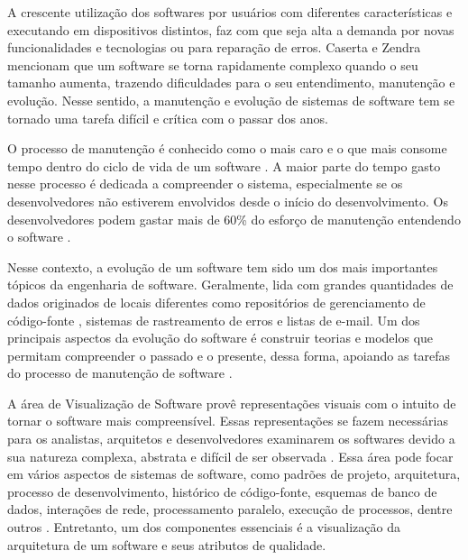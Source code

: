 
A crescente utilização dos softwares por usuários com diferentes características e executando em dispositivos distintos, faz com que seja alta a demanda por novas funcionalidades e tecnologias ou para reparação de erros. Caserta e Zendra \cite{Caserta2011} mencionam que um software se torna rapidamente complexo quando o seu tamanho aumenta, trazendo dificuldades para o seu entendimento, manutenção e evolução. Nesse sentido, a manutenção e evolução de sistemas de software tem se tornado uma tarefa difícil e crítica com o passar dos anos.

O processo de manutenção é conhecido como o mais caro e o que mais consome tempo dentro do ciclo de vida de um software \cite{Abreu1995}. A maior parte do tempo gasto nesse processo é dedicada a compreender o sistema, especialmente se os desenvolvedores não estiverem envolvidos desde o início do desenvolvimento. Os desenvolvedores podem gastar mais de 60\% do esforço de manutenção entendendo o software \cite{Corbi1989}.

Nesse contexto, a evolução de um software tem sido um dos mais importantes tópicos da engenharia de software. Geralmente, lida com grandes quantidades de dados originados de locais diferentes como repositórios de gerenciamento de código-fonte , sistemas de rastreamento de erros  e listas de e-mail. Um dos principais aspectos da evolução do software é construir teorias e modelos que permitam compreender o passado e o presente, dessa forma, apoiando as tarefas do processo de manutenção de software \cite{Novais2013}.

A área de Visualização de Software provê representações visuais com o intuito de tornar o software mais compreensível. Essas representações se fazem necessárias para os analistas, arquitetos e desenvolvedores examinarem os softwares devido a sua natureza complexa, abstrata e difícil de ser observada \cite{Petre2006}. Essa área pode focar em vários aspectos de sistemas de software, como padrões de projeto, arquitetura, processo de desenvolvimento, histórico de código-fonte, esquemas de banco de dados, interações de rede, processamento paralelo, execução de processos, dentre outros \cite{Ghanam2008}. Entretanto, um dos componentes essenciais é a visualização da arquitetura de um software e seus atributos de qualidade.

